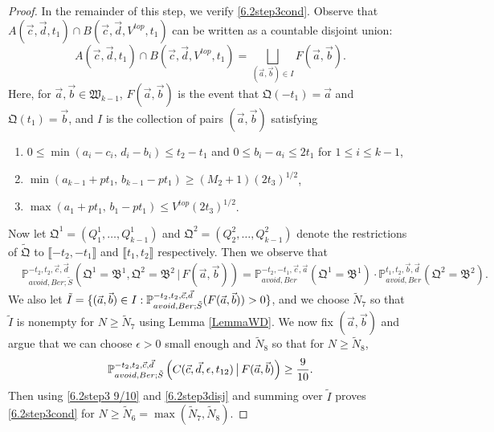 \begin{proof}
	In the remainder of this step, we verify \eqref{6.2step3cond}. Observe that $A(\vec{c},\vec{d},t_1) \cap B(\vec{c},\vec{d},V^{top},t_1)$ can be written as a countable disjoint union: 
	\begin{equation}\label{6.2step3disj}
	A(\vec{c},\vec{d},t_1) \cap B(\vec{c},\vec{d},V^{top},t_1) = \bigsqcup_{(\vec{a},\vec{b})\in I} F(\vec{a},\vec{b}).
	\end{equation}
	Here, for $\vec{a},\vec{b}\in\mathfrak{W}_{k-1}$, $F(\vec{a},\vec{b})$ is the event that $\mathfrak{Q}(-t_1) = \vec{a}$ and $\mathfrak{Q}(t_1) = \vec{b}$, and $I$ is the collection of pairs $(\vec{a},\vec{b})$ satisfying
	\begin{enumerate}[label = (\arabic*)]
		
		\item $ 0 \leq \min(a_i - c_i,\, d_i - b_i) \leq t_2 - t_1$ and $0\leq b_i-a_i \leq 2t_1$ for $1\leq i\leq k-1$,
		
		\item $\min(a_{k-1} + pt_1,\, b_{k-1} - pt_1) \geq (M_2+1)(2t_3)^{1/2}$,
		
		\item $\max(a_1 + pt_1,\, b_1 - pt_1) \leq V^{top}(2t_3)^{1/2}$.
		
	\end{enumerate}
	Now let $\mathfrak{Q}^1 = (Q^1_1,\dots,Q^1_{k-1})$ and $\mathfrak{Q}^2 = (Q^2_2,\dots,Q^2_{k-1})$ denote the restrictions of $\tilde{\mathfrak{Q}}$ to $\llbracket -t_2,-t_1\rrbracket$ and $\llbracket t_1,t_2\rrbracket$ respectively. Then we observe that
	\begin{equation}\label{6.2step3ind}
	\begin{split}
	&\mathbb{P}^{-t_2,t_2,\vec{c},\vec{d}}_{avoid, Ber; \tilde S}\left(\mathfrak{Q}^1 = \mathfrak{B}^1, \mathfrak{Q}^2 = \mathfrak{B}^2\,\big|\,F(\vec{a},\vec{b})\right) = \mathbb{P}^{-t_2,-t_1,\vec{c},\vec{a}}_{avoid, Ber}\left(\mathfrak{Q}^1 = \mathfrak{B}^1\right) \cdot \mathbb{P}^{t_1,t_2,\vec{b},\vec{d}}_{avoid, Ber}\left(\mathfrak{Q}^2 = \mathfrak{B}^2\right).
	\end{split}
	\end{equation}
	We also let $\tilde{I} = \{(\vec{a},\vec{b})\in I : \mathbb{P}^{-t_2,t_2,\vec c, \vec d}_{avoid,Ber;\tilde{S}}(F(\vec{a},\vec{b})) > 0\}$, and we choose $\tilde{N}_7$ so that $\tilde{I}$ is nonempty for $N\geq\tilde{N}_7$ using Lemma \ref{LemmaWD}. We now fix $(\vec{a},\vec{b})$ and argue that we can choose $\epsilon > 0$ small enough and $\tilde{N}_8$ so that for $N\geq\tilde{N}_8$,
	\begin{equation}\label{6.2step3 9/10}
	\mathbb{P}^{-t_2,t_2,\vec c, \vec d}_{avoid,Ber;\tilde{S}}\left(C(\vec{c},\vec{d},\epsilon,t_{12})\,\big|\, F(\vec{a},\vec{b})\right) \geq \frac{9}{10}.
	\end{equation}
	Then using \eqref{6.2step3 9/10} and \eqref{6.2step3disj} and summing over $\tilde{I}$ proves \eqref{6.2step3cond} for $N\geq\tilde{N}_6 = \max(\tilde{N}_7,\tilde{N}_8)$.
	

\end{proof}
